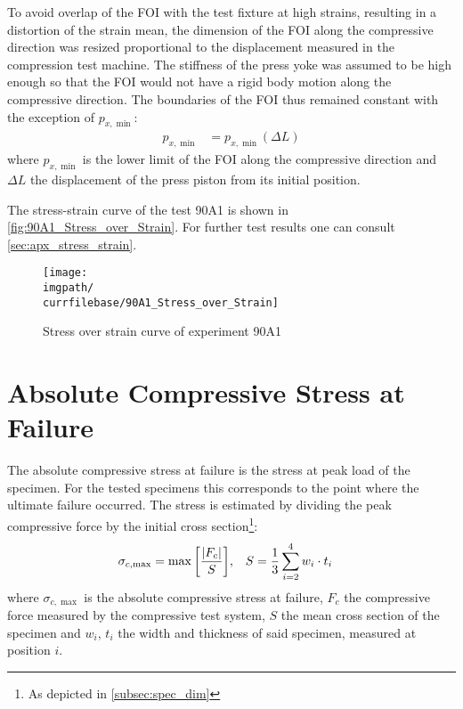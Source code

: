 To avoid overlap of the FOI with the test fixture at high strains, resulting in a distortion of the strain mean, the dimension of the FOI along the compressive direction was resized proportional to the displacement measured in the compression test machine. The stiffness of the press yoke was assumed to be high enough so that the FOI would not have a rigid body motion along the compressive direction. The boundaries of the FOI thus remained constant with the exception of $p_{x,\min}$:
\begin{align*}
    p_{x,\min} &= p_{x,\min}(\Delta L)
\end{align*}
where $p_{x,\min}$ is the lower limit of the FOI along the compressive direction and $\Delta L$ the displacement of the press piston from its initial position.

The stress-strain curve of the test 90A1 is shown in \autoref{fig:90A1_Stress_over_Strain}. For further test results one can consult \autoref{sec:apx_stress_strain}.

\begin{figure}[!ht]
    \texttt{[image: \\imgpath/\\currfilebase/90A1\_Stress\_over\_Strain]}
    \caption{Stress over strain curve of experiment 90A1}
    \label{fig:90A1_Stress_over_Strain}
\end{figure}

\section{Absolute Compressive Stress at Failure}
\label{sec:abs_comp_stress}

The absolute compressive stress at failure is the stress at peak load of the specimen. For the tested specimens this corresponds to the point where the ultimate failure occurred. The stress is estimated by dividing the peak compressive force by the initial cross section\footnote{As depicted in \autoref{subsec:spec_dim}}:
\begin{align*}
    \sigma_{c,\max} &= \max\bqty{\frac{\abs{F_{c}}}{S}}, &S &= \frac{1}{3}\sum\limits_{i=2}^4 w_i\cdot t_i
\end{align*}
where $\sigma_{c,\max}$ is the absolute compressive stress at failure, $F_c$ the compressive force measured by the compressive test system, $S$ the mean cross section of the specimen and $w_i$, $t_i$ the width and thickness of said specimen, measured at position $i$.

\newcommand{\visfeat}[1]{%
    \raisebox{-0.5ex}{%
        \texttt{[image: \\imgpath/\\currfilebase/visual\_features]}}
}

